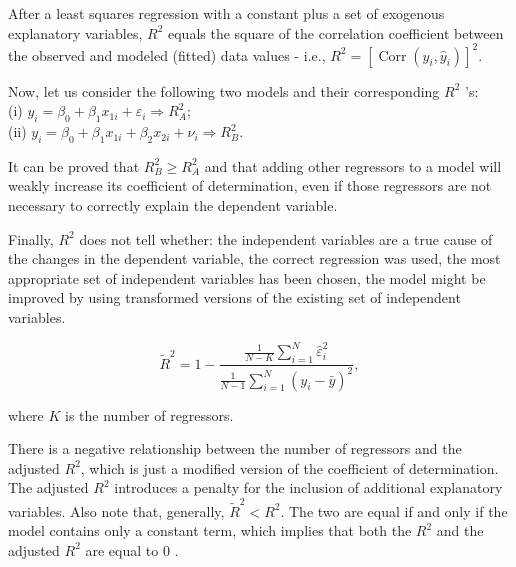 After a least squares regression with a constant plus a set of exogenous explanatory variables, $R^{2}$ equals the square of the correlation coefficient between the observed and modeled (fitted) data values - i.e., $R^{2}=\left[\operatorname{Corr}\left(y_{i}, \widehat{y}_{i}\right)\right]^{2}$.

Now, let us consider the following two models and their corresponding $R^{2}$ 's:\\
(i) $y_{i}=\beta_{0}+\beta_{1} x_{1 i}+\varepsilon_{i} \Longrightarrow R_{A}^{2}$;\\
(ii) $y_{i}=\beta_{0}+\beta_{1} x_{1 i}+\beta_{2} x_{2 i}+\nu_{i} \Longrightarrow R_{B}^{2}$.

It can be proved that $R_{B}^{2} \geq R_{A}^{2}$ and that adding other regressors to a model will weakly increase its coefficient of determination, even if those regressors are not necessary to correctly explain the dependent variable.

Finally, $R^{2}$ does not tell whether: the independent variables are a true cause of the changes in the dependent variable, the correct regression was used, the most appropriate set of independent variables has been chosen, the model might be improved by using transformed versions of the existing set of independent variables.

\begin{definition}[Adjusted $R^{2}$]
    $$
    \tilde{R}^{2}=1-\frac{\frac{1}{N-K} \sum_{i=1}^{N} \widehat{\varepsilon}_{i}^{2}}{\frac{1}{N-1} \sum_{i=1}^{N}\left(y_{i}-\bar{y}\right)^{2}},
    $$
    
    where $K$ is the number of regressors.
\end{definition}

There is a negative relationship between the number of regressors and the adjusted $R^{2}$, which is just a modified version of the coefficient of determination. The adjusted $R^{2}$ introduces a penalty for the inclusion of additional explanatory variables. Also note that, generally, $\tilde{R}^{2}<R^{2}$. The two are equal if and only if the model contains only a constant term, which implies that both the $R^{2}$ and the adjusted $R^{2}$ are equal to 0 .